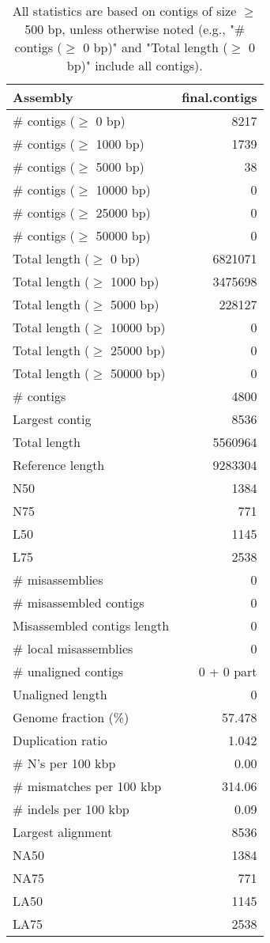 \documentclass[12pt,a4paper]{article}
\begin{document}
\begin{table}[ht]
\begin{center}
\caption{All statistics are based on contigs of size $\geq$ 500 bp, unless otherwise noted (e.g., "\# contigs ($\geq$ 0 bp)" and "Total length ($\geq$ 0 bp)" include all contigs).}
\begin{tabular}{|l*{1}{|r}|}
\hline
Assembly & final.contigs \\ \hline
\# contigs ($\geq$ 0 bp) & 8217 \\ \hline
\# contigs ($\geq$ 1000 bp) & 1739 \\ \hline
\# contigs ($\geq$ 5000 bp) & 38 \\ \hline
\# contigs ($\geq$ 10000 bp) & 0 \\ \hline
\# contigs ($\geq$ 25000 bp) & 0 \\ \hline
\# contigs ($\geq$ 50000 bp) & 0 \\ \hline
Total length ($\geq$ 0 bp) & 6821071 \\ \hline
Total length ($\geq$ 1000 bp) & 3475698 \\ \hline
Total length ($\geq$ 5000 bp) & 228127 \\ \hline
Total length ($\geq$ 10000 bp) & 0 \\ \hline
Total length ($\geq$ 25000 bp) & 0 \\ \hline
Total length ($\geq$ 50000 bp) & 0 \\ \hline
\# contigs & 4800 \\ \hline
Largest contig & 8536 \\ \hline
Total length & 5560964 \\ \hline
Reference length & 9283304 \\ \hline
N50 & 1384 \\ \hline
N75 & 771 \\ \hline
L50 & 1145 \\ \hline
L75 & 2538 \\ \hline
\# misassemblies & 0 \\ \hline
\# misassembled contigs & 0 \\ \hline
Misassembled contigs length & 0 \\ \hline
\# local misassemblies & 0 \\ \hline
\# unaligned contigs & 0 + 0 part \\ \hline
Unaligned length & 0 \\ \hline
Genome fraction (\%) & 57.478 \\ \hline
Duplication ratio & 1.042 \\ \hline
\# N's per 100 kbp & 0.00 \\ \hline
\# mismatches per 100 kbp & 314.06 \\ \hline
\# indels per 100 kbp & 0.09 \\ \hline
Largest alignment & 8536 \\ \hline
NA50 & 1384 \\ \hline
NA75 & 771 \\ \hline
LA50 & 1145 \\ \hline
LA75 & 2538 \\ \hline
\end{tabular}
\end{center}
\end{table}
\end{document}

